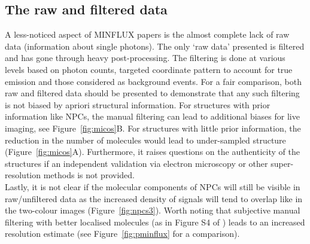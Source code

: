 \documentclass[9pt,twocolumn,twoside]{pnas-new}
\begin{document}
\subsection{The raw and filtered data}
A less-noticed aspect of MINFLUX papers is the almost complete lack of raw data (information about single photons). The only `raw data' presented is filtered and has gone through heavy post-processing. The filtering is done at various levels based on photon counts, targeted coordinate pattern to account for true emission and those considered as background events. For a fair comparison, both raw and filtered data should be presented to demonstrate that any such filtering is not biased by apriori structural information. For structures with prior information like NPCs, the manual filtering can lead to additional biases for live imaging, see Figure~\ref{fig:micos}B. For structures with little prior information, the reduction in the number of molecules would lead to under-sampled structure (Figure~\ref{fig:micos}A). Furthermore, it raises questions on the authenticity of the structures if an independent validation via electron microscopy or other super-resolution methods is not provided.\\
Lastly, it is not clear if the molecular components of NPCs will still be visible in raw/unfiltered data as the increased density of signals will tend to overlap like in the two-colour images (Figure~\ref{fig:npcs3}). Worth noting that subjective manual filtering with better localised molecules (as in Figure S4 of \cite{gwosch2020minflux}) leads to an increased resolution estimate (see Figure~\ref{fig:pminflux} for a comparison). 
\end{document}
